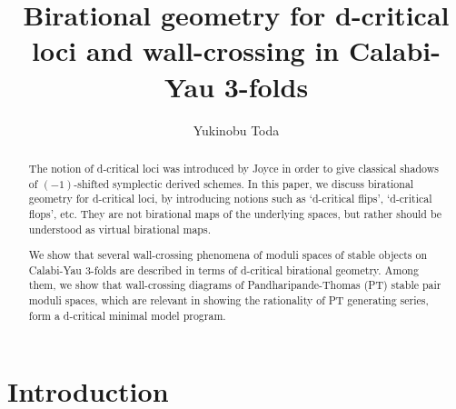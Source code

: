 \documentclass[11pt]{amsart}
\title[Birational geometry for d-critical loci]{Birational geometry for
d-critical loci and wall-crossing in Calabi-Yau 3-folds}
\date{}
\author{Yukinobu Toda}
\theoremstyle{plain}
\theoremstyle{definition}
\theoremstyle{remark}
\begin{document}
\begin{abstract}
The notion of d-critical loci was introduced by Joyce
in order to give classical shadows of $(-1)$-shifted 
symplectic derived schemes. 
In this paper, we discuss 
birational geometry for 
d-critical loci, 
by introducing notions such as  
`d-critical flips', `d-critical flops', etc. 
They are not birational maps of the underlying 
spaces, but rather
should be understood as 
virtual birational maps.  

We show that several wall-crossing phenomena of 
moduli spaces of stable objects on Calabi-Yau 3-folds
are described in terms of d-critical 
birational geometry. 
Among them, we show that
wall-crossing diagrams of 
Pandharipande-Thomas (PT)
stable pair moduli spaces,  
which 
are relevant in showing the rationality of PT 
generating series, 
 form a
d-critical minimal model program. 
\end{abstract}

\maketitle


\setcounter{tocdepth}{1}
\tableofcontents






\section{Introduction}
\end{document}
